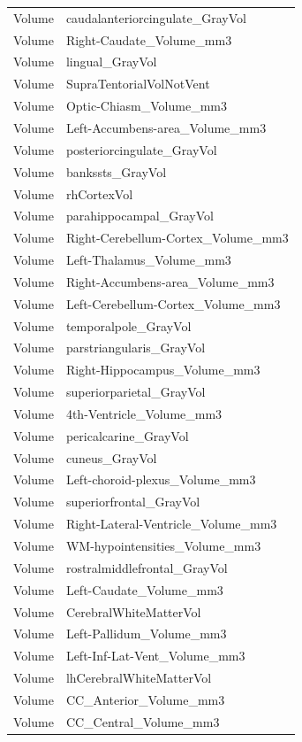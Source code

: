 \documentclass[pdflatex,sn-nature]{sn-jnl}%
\theoremstyle{thmstyleone}%
\theoremstyle{thmstyletwo}%
\theoremstyle{thmstylethree}%
\begin{document}
\begin{appendices}
\begin{small}
\begin{longtable}{l|l}
Volume & caudalanteriorcingulate\_GrayVol \\
Volume & Right-Caudate\_Volume\_mm3 \\
Volume & lingual\_GrayVol \\
Volume & SupraTentorialVolNotVent \\
Volume & Optic-Chiasm\_Volume\_mm3 \\
Volume & Left-Accumbens-area\_Volume\_mm3 \\
Volume & posteriorcingulate\_GrayVol \\
Volume & bankssts\_GrayVol \\
Volume & rhCortexVol \\
Volume & parahippocampal\_GrayVol \\
Volume & Right-Cerebellum-Cortex\_Volume\_mm3 \\
Volume & Left-Thalamus\_Volume\_mm3 \\
Volume & Right-Accumbens-area\_Volume\_mm3 \\
Volume & Left-Cerebellum-Cortex\_Volume\_mm3 \\
Volume & temporalpole\_GrayVol \\
Volume & parstriangularis\_GrayVol \\
Volume & Right-Hippocampus\_Volume\_mm3 \\
Volume & superiorparietal\_GrayVol \\
Volume & 4th-Ventricle\_Volume\_mm3 \\
Volume & pericalcarine\_GrayVol \\
Volume & cuneus\_GrayVol \\
Volume & Left-choroid-plexus\_Volume\_mm3 \\
Volume & superiorfrontal\_GrayVol \\
Volume & Right-Lateral-Ventricle\_Volume\_mm3 \\
Volume & WM-hypointensities\_Volume\_mm3 \\
Volume & rostralmiddlefrontal\_GrayVol \\
Volume & Left-Caudate\_Volume\_mm3 \\
Volume & CerebralWhiteMatterVol \\
Volume & Left-Pallidum\_Volume\_mm3 \\
Volume & Left-Inf-Lat-Vent\_Volume\_mm3 \\
Volume & lhCerebralWhiteMatterVol \\
Volume & CC\_Anterior\_Volume\_mm3 \\
Volume & CC\_Central\_Volume\_mm3 \\

\end{longtable}
\end{small}
\end{appendices}
\end{document}

